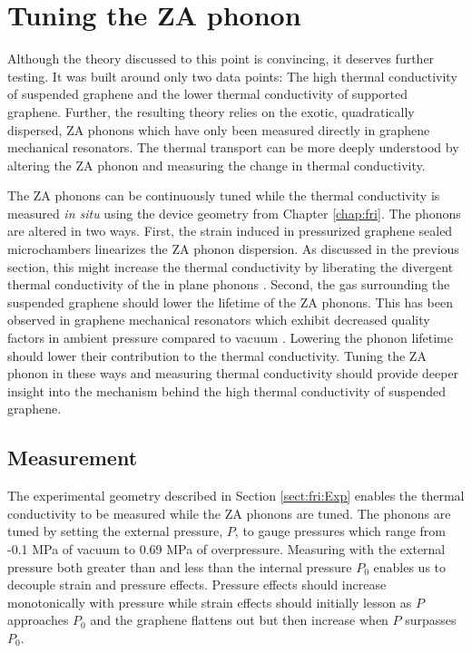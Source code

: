 \section{Tuning the ZA phonon}
Although the theory discussed to this point is convincing, it deserves further testing.
It was built around only two data points: The high thermal conductivity of suspended graphene and the lower thermal conductivity of supported graphene.
Further, the resulting theory relies on the exotic, quadratically dispersed, ZA phonons which have only been measured directly in graphene mechanical resonators.
The thermal transport can be more deeply understood by altering the ZA phonon and measuring the change in thermal conductivity.

The ZA phonons can be continuously tuned while the thermal conductivity is measured \textit{in situ} using the device geometry from Chapter \ref{chap:fri}.
The phonons are altered in two ways.
First, the strain induced in pressurized graphene sealed microchambers linearizes the ZA phonon dispersion.
As discussed in the previous section, this might increase the thermal conductivity by liberating the divergent thermal conductivity of the in plane phonons \cite{Pereira2013,Bonini2012}.
Second, the gas surrounding the suspended graphene should lower the lifetime of the ZA phonons.
This has been observed in graphene mechanical resonators which exhibit decreased quality factors in ambient pressure compared to vacuum \cite{Bunch2007}.
Lowering the phonon lifetime should lower their contribution to the thermal conductivity.
Tuning the ZA phonon in these ways and measuring thermal conductivity should provide deeper insight into the mechanism behind the high thermal conductivity of suspended graphene.

\subsection{Measurement}
The experimental geometry described in Section \ref{sect:fri:Exp} enables the thermal conductivity to be measured while the ZA phonons are tuned.
The phonons are tuned by setting the external pressure, $P$, to gauge pressures which range from -0.1 MPa of vacuum to 0.69 MPa of overpressure.
Measuring with the external pressure both greater than and less than the internal pressure $P_0$ enables us to decouple strain and pressure effects.
Pressure effects should increase monotonically with pressure while strain effects should initially lesson as $P$ approaches $P_0$ and the graphene flattens out but then increase when $P$ surpasses $P_0$.

